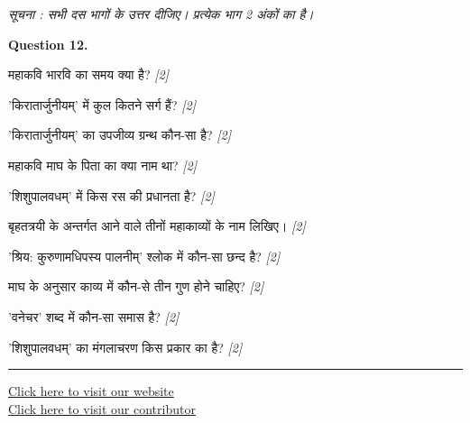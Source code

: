 \documentclass[11pt,a4paper]{article}
\newcommand{\pts}[1]{\hfill \textit{[#1]}}
\begin{document}
\noindent \textit{सूचना : सभी दस भागों के उत्तर दीजिए। प्रत्येक भाग 2 अंकों का है।}\\[2pt]

\bigskip

\noindent \textbf{Question 12.}
\begin{parts}
  \item महाकवि भारवि का समय क्या है? \pts{2}
  \item 'किरातार्जुनीयम्' में कुल कितने सर्ग हैं? \pts{2}
  \item 'किरातार्जुनीयम्' का उपजीव्य ग्रन्थ कौन-सा है? \pts{2}
  \item महाकवि माघ के पिता का क्या नाम था? \pts{2}
  \item 'शिशुपालवधम्' में किस रस की प्रधानता है? \pts{2}
  \item बृहतत्रयी के अन्तर्गत आने वाले तीनों महाकाव्यों के नाम लिखिए। \pts{2}
  \item 'श्रिय: कुरुणामधिपस्य पालनीम्' श्लोक में कौन-सा छन्द है? \pts{2}
  \item माघ के अनुसार काव्य में कौन-से तीन गुण होने चाहिए? \pts{2}
  \item 'वनेचर' शब्द में कौन-सा समास है? \pts{2}
  \item 'शिशुपालवधम्' का मंगलाचरण किस प्रकार का है? \pts{2}
\end{parts}

\vfill
\rule{\linewidth}{0.4pt}

\begin{center}\small
\href{https://bhu-exam.vercel.app/}{Click here to visit our website}\\[4pt]
\href{https://me-aryan.vercel.app/}{Click here to visit our contributor}
\end{center}
\end{document}
